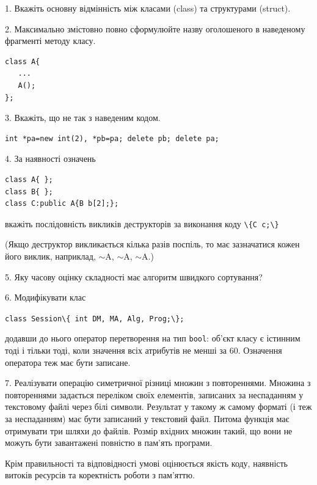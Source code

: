 \documentclass[12pt, ukrainian]{article}
\def\code#1{\Verb!#1!}
\begin{document}
{%
1. Вкажіть основну відмінність між класами (class) та структурами (struct).%
\par
\vspace{2mm}
2. Максимально змістовно повно сформулюйте назву оголошеного в наведеному фрагменті методу класу.
\vspace{-3mm}
\begin{verbatim}class A{
   ...
   A();
};\end{verbatim}
\vspace{-3mm}
\par
\vspace{2mm}
3. Вкажіть, що не так з наведеним кодом.
\vspace{-3mm}
\begin{verbatim}int *pa=new int(2), *pb=pa; delete pb; delete pa;\end{verbatim}
\vspace{-3mm}
\par
\vspace{2mm}
4. За наявності означень
\vspace{-3mm}
\begin{verbatim}
class A{ };
class B{ };
class C:public A{B b[2];};\end{verbatim}
\vspace{-3mm}
вкажіть послідовність викликів деструкторів за виконання коду \code{\{C c;\}} 

(Якщо деструктор викликається кілька разів поспіль, то має зазначатися кожен його виклик, наприклад, $\sim$A, $\sim$A, $\sim$A.)

\vspace{2mm}
5. Яку часову оцінку складності має алгоритм швидкого сортування?
\par
\vspace{2mm}
6. Модифікувати клас 

\qquad\code{class Session\{ int DM, MA, Alg, Prog;\};} 


додавши до нього оператор перетворення на тип \code{bool}: об'єкт класу є істинним тоді і тільки тоді, коли значення всіх атрибутів не менші за 60. Означення оператора теж має бути записане.%
\par
\vspace{2mm}
7. 
Реалізувати операцію симетричної різниці множин з повтореннями. Множина з повтореннями задається переліком своїх елементів, записаних за неспаданням у текстовому файлі через білі символи. Результат у такому ж самому форматі (і теж за неспаданням) має бути записаний у текстовий файл. Питома функція має отримувати три шляхи до файлів. Розмір вхідних множин такий, що вони не можуть бути завантажені повністю в пам’ять програми.

Крім правильності та відповідності умові оцінюється якість коду, наявність витоків ресурсів та коректність роботи з пам'яттю. 

}
\end{document}
